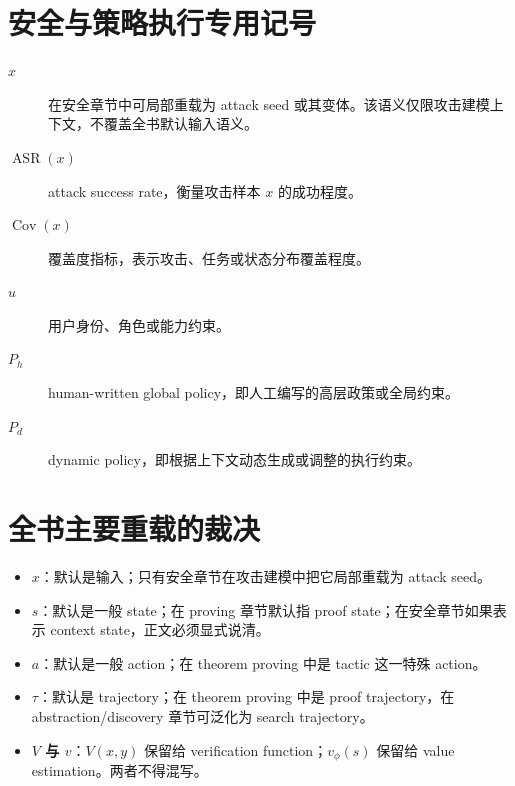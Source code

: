 \section{安全与策略执行专用记号}

\begin{description}
\item[$x$] 在安全章节中可局部重载为 attack seed 或其变体。该语义仅限攻击建模上下文，不覆盖全书默认输入语义。

\item[$\operatorname{ASR}(x)$] attack success rate，衡量攻击样本 $x$ 的成功程度。

\item[$\operatorname{Cov}(x)$] 覆盖度指标，表示攻击、任务或状态分布覆盖程度。

\item[$u$] 用户身份、角色或能力约束。

\item[$P_h$] human-written global policy，即人工编写的高层政策或全局约束。

\item[$P_d$] dynamic policy，即根据上下文动态生成或调整的执行约束。
\end{description}

\section{全书主要重载的裁决}

\begin{itemize}
\item \textbf{$x$}：默认是输入；只有安全章节在攻击建模中把它局部重载为 attack seed。
\item \textbf{$s$}：默认是一般 state；在 proving 章节默认指 proof state；在安全章节如果表示 context state，正文必须显式说清。
\item \textbf{$a$}：默认是一般 action；在 theorem proving 中是 tactic 这一特殊 action。
\item \textbf{$\tau$}：默认是 trajectory；在 theorem proving 中是 proof trajectory，在 abstraction/discovery 章节可泛化为 search trajectory。
\item \textbf{$V$ 与 $v$}：$V(x,y)$ 保留给 verification function；$v_\phi(s)$ 保留给 value estimation。两者不得混写。
\end{itemize}

